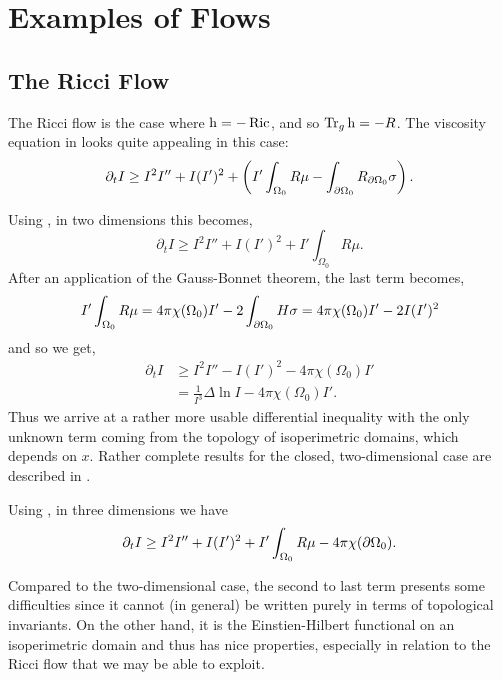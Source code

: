 \documentclass{amsart}
\begin{document}
\section{Examples of Flows}
\label{sec:flows}

\subsection{The Ricci Flow}
\label{subsec:flows_ricci}

The Ricci flow is the case where $\operatorname{h} = -\operatorname{Ric}$, and so $\operatorname{Tr}_g \operatorname{h} = -R$. The viscosity equation in  looks quite appealing in this case:
\begin{equation}
\label{eq:viscosity_ricciflow}
\partial_t I \geq I^2I'' + I(I')^2 + \left(I'\int_{\Omega_0} R \mu - \int_{\partial {\Omega_0}} R_{\partial {\Omega_0}}\sigma \right).
\end{equation}

Using , in two dimensions this becomes,
\[
\partial_t I \geq I^2I'' + I(I')^2 + I'\int_{\Omega_0} R \mu.
\]
After an application of the Gauss-Bonnet theorem, the last term becomes,
\[
I'\int_{\Omega_0} R \mu = 4\pi\chi(\Omega_0)I' - 2\int_{\partial {\Omega_0}} H \sigma = 4\pi\chi(\Omega_0)I'- 2 I (I')^2
\]
and so we get,
\begin{equation}
\label{eq:2d_viscosity_ricciflow}
\begin{split}
\partial_t I &\geq I^2I'' - I(I')^2 - 4\pi\chi(\Omega_0)I' \\
&= \frac{1}{I^3} \Delta \ln I - 4\pi\chi(\Omega_0)I'.
\end{split}
\end{equation}
Thus we arrive at a rather more usable differential inequality with the only unknown term coming from the topology of isoperimetric domains, which depends on \(x\). Rather complete results for the closed, two-dimensional case are described in \cite{Bryan:/2016,AndrewsBryan:/2010}.

Using , in three dimensions we have
\begin{equation}
\label{eq:3d_viscosity_ricciflow}
\partial_t I \geq I^2I'' + I(I')^2 + I'\int_{\Omega_0} R \mu - 4\pi\chi(\partial {\Omega_0}).
\end{equation}

Compared to the two-dimensional case, the second to last term presents some difficulties since it cannot (in general) be written purely in terms of topological invariants. On the other hand, it is the Einstien-Hilbert functional on an isoperimetric domain and thus has nice properties, especially in relation to the Ricci flow that we may be able to exploit.
\end{document}
